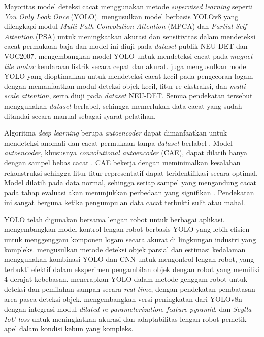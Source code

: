 Mayoritas model deteksi cacat menggunakan metode \textit{supervised
learning} seperti \textit{You Only Look Once} (YOLO). \citet{29}
mengusulkan model berbasis YOLOv8 yang dilengkapi modul
\textit{Multi-Path Convolution Attention} (MPCA) dan \textit{Partial
Self-Attention} (PSA) untuk meningkatkan akurasi dan sensitivitas
dalam mendeteksi cacat permukaan baja dan model ini diuji pada
\textit{dataset} publik NEU-DET dan VOC2007. \citet{30} mengembangkan
model YOLO untuk mendeteksi cacat pada \textit{magnet tile motor}
kendaraan listrik secara cepat dan akurat. \citet{31} juga
mengusulkan model YOLO yang dioptimalkan untuk mendeteksi cacat kecil
pada pengecoran logam dengan memanfaatkan modul deteksi objek kecil,
fitur re-ekstraksi, dan \textit{multi-scale attention}, serta diuji
pada \textit{dataset} NEU-DET. Semua pendekatan
tersebut menggunakan \textit{dataset} berlabel, sehingga memerlukan
data cacat yang sudah ditandai secara manual sebagai syarat pelatihan.

Algoritma \textit{deep learning} berupa \textit{autoencoder} dapat
dimanfaatkan untuk mendeteksi anomali dan cacat permukaan tanpa
\textit{dataset} berlabel \citep{7}.
Model \textit{autoencoder}, khususnya \textit{convolutional
autoencoder} (CAE), dapat dilatih hanya dengan sampel bebas cacat
\citep{8}. CAE bekerja dengan meminimalkan kesalahan rekonstruksi
sehingga fitur-fitur representatif dapat teridentifikasi secara
optimal. Model dilatih pada data normal, sehingga setiap sampel yang
mengandung cacat pada tahap evaluasi akan menunjukkan perbedaan yang
signifikan \citep{9}. Pendekatan ini sangat berguna ketika
pengumpulan data cacat terbukti sulit atau mahal.

YOLO telah digunakan bersama lengan robot untuk berbagai aplikasi.
\citet{10} mengembangkan model kontrol
lengan robot berbasis YOLO yang lebih efisien untuk menggenggam
komponen logam secara akurat di lingkungan industri yang kompleks.
\citet{11} mengusulkan metode deteksi objek
parsial dan estimasi kedalaman menggunakan kombinasi YOLO dan CNN
untuk mengontrol lengan robot, yang terbukti efektif dalam eksperimen
pengambilan objek dengan robot yang memiliki 4 derajat kebebasan.
\citet{12} menerapkan YOLO dalam
metode genggam robot untuk deteksi dan
pemilahan sampah secara \textit{real-time}, dengan pendekatan pembatasan area
pasca deteksi objek. \citet{13} mengembangkan versi
peningkatan dari YOLOv8n dengan integrasi modul \textit{dilated
re-parameterization}, \textit{feature pyramid}, dan
\textit{Scylla-IoU loss} untuk
meningkatkan akurasi dan adaptabilitas lengan robot pemetik apel
dalam kondisi kebun yang kompleks.

